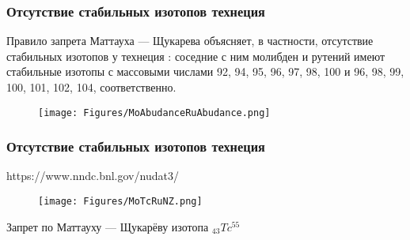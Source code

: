 \begin{frame}
\frametitle{Отсутствие стабильных изотопов технеция}
Правило запрета Маттауха — Щукарева объясняет, в частности, {\color{red}отсутствие стабильных изотопов у технеция} %
: соседние с ним молибден и рутений имеют стабильные изотопы с массовыми числами 92, 94, 95, 96, 97, 98, 100 и 96, 98, 99, 100, 101, 102, 104, соответственно. 

\begin{figure}[ht] 
	\centering\small
	\unitlength=1mm
	\texttt{[image: Figures/MoAbudanceRuAbudance.png]} 
\end{figure}	
\end{frame}

\begin{frame}
\frametitle{Отсутствие стабильных изотопов технеция}

https://www.nndc.bnl.gov/nudat3/
\begin{figure}[ht] 
	\centering\small
	\unitlength=1mm
	\texttt{[image: Figures/MoTcRuNZ.png]} 
\end{figure}	
Запрет по Маттауху — Щукарёву изотопа $_{43}Tc^{55}$
\end{frame}
